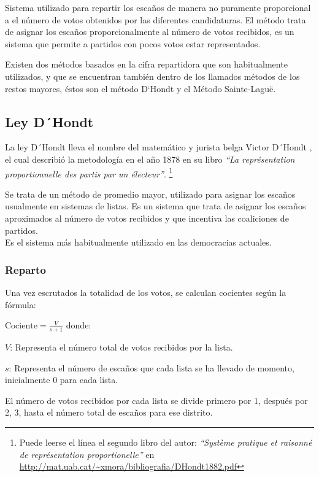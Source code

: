 \documentclass[12pt,a4paper,]{book}
\let\rmarkdownfootnote\footnote%
\def\footnote{\protect\rmarkdownfootnote}
\numberwithin{dummy}{section}
\theoremstyle{ocrenumbox}
\theoremstyle{blacknumex}
\theoremstyle{blacknumbox}
\theoremstyle{ocrenum}
\theoremstyle{ocrenum}
\begin{document}
Sistema utilizado para repartir los escaños de manera no puramente
proporcional a el número de votos obtenidos por las diferentes
candidaturas. El método trata de asignar los escaños proporcionalmente
al número de votos recibidos, es un sistema que permite a partidos con
pocos votos estar representados.

Existen dos métodos basados en la cifra repartidora que son
habitualmente utilizados, y que se encuentran también dentro de los
llamados métodos de los restos mayores, éstos son el método D`Hondt y el
Método Sainte-Laguë.

\hypertarget{ley-dhondt}{%
\subsection{Ley D´Hondt}\label{ley-dhondt}}

La ley D´Hondt lleva el nombre del matemático y jurista belga Victor
D´Hondt , el cual describió la metodología en el año 1878 en su libro
\emph{``La représentation proportionnelle des partis par un électeur''}.
\footnote{Puede leerse el línea el segundo libro del autor:
  \emph{``Système pratique et raisonné de représentation
  proportionelle''} en
  \url{http://mat.uab.cat/~xmora/bibliografia/DHondt1882.pdf}}

Se trata de un método de promedio mayor, utilizado para asignar los
escaños usualmente en sistemas de listas. Es un sistema que trata de
asignar los escaños aproximados al número de votos recibidos y que
incentiva las coaliciones de partidos.\\
Es el sistema más habitualmente utilizado en las democracias actuales.

\hypertarget{reparto}{%
\subsubsection{Reparto}\label{reparto}}

Una vez escrutados la totalidad de los votos, se calculan cocientes
según la fórmula:

\(\textrm{Cociente} = \frac{V}{s+1}\) donde:

\(V\): Representa el número total de votos recibidos por la lista.

\(s\): Representa el número de escaños que cada lista se ha llevado de
momento, inicialmente 0 para cada lista.

El número de votos recibidos por cada lista se divide primero por 1,
después por 2, 3, hasta el número total de escaños para ese distrito.
\end{document}
